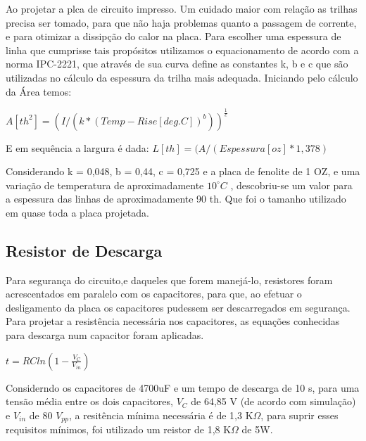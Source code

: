\documentclass[a4paper,12pt,oneside,openany,table,xcdraw]{article}
\begin{document}
Ao projetar a plca de circuito impresso. Um cuidado maior com relação as trilhas precisa ser tomado, para que não haja problemas quanto a passagem de corrente, e para otimizar a dissipção do calor na placa. 
Para escolher uma espessura de linha que cumprisse tais propósitos utilizamos o equacionamento de acordo com a norma IPC-2221, que através de sua curva define as constantes k, b e c que são utilizadas no cálculo da espessura da trilha mais adequada.
Iniciando pelo cálculo da Área temos:

\begin{math}
A [\mathit{th^{2}}] = (I/ (k * (Temp-Rise [deg. C])^{b}))^{\frac{1}{c}}
 \end{math}
 
E em sequência a largura é dada:
\begin{math}
L [\mathit{th}] = (A/(Espessura [oz] * 1,378)
 \end{math}

Considerando  k = 0,048, b = 0,44, c = 0,725 e a placa de fenolite de 1 OZ, e uma variação de temperatura de aproximadamente \begin{math} 10^{\circ}C  \end{math} , descobriu-se um valor para a espessura das linhas de aproximadamente 90 th. Que foi o tamanho utilizado em quase toda a placa projetada.


\subsection{Resistor de Descarga}

Para segurança do circuito,e daqueles que forem manejá-lo, resistores foram acrescentados em paralelo com os capacitores, para que, ao efetuar o desligamento da placa os capacitores pudessem ser descarregados em segurança.
Para projetar a resistência necessária nos capacitores, as equações conhecidas para descarga num capacitor foram aplicadas.

\begin{math} t= RCln\left ( 1 - \frac{V_{C}}{V_{in}} \right ) \end{math}

Considerndo os capacitores de 4700uF e um tempo de descarga de 10 s, para uma tensão média entre os dois capacitores, \begin{math}V_{C}\end{math} de 64,85 V (de acordo com simulação) e \begin{math}V_{in}\end{math} de 80 \begin{math}V_{pp}\end{math}, a resitência mínima necessária é de 1,3 K\begin{math}\Omega\end{math}, para suprir esses requisitos mínimos, foi utilizado um reistor de 1,8 K\begin{math}\Omega\end{math} de 5W. 
\end{document}

